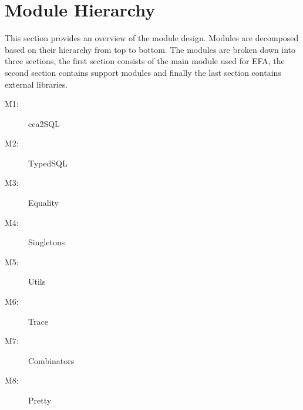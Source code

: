 \documentclass[12pt, svgnames]{article}
\begin{document}
\section{Module Hierarchy}
This section provides an overview of the module design. Modules are decomposed 
based on their hierarchy from top to bottom. The modules are broken down into 
three sections, the first section consists of the main module used for EFA, 
the second section contains support modules and finally the last section
contains external libraries.

\begin{description}
    \item[M1:] eca2SQL
    \item[M2:] TypedSQL
    \item[M3:] Equality
    \item[M4:] Singletons
    \item[M5:] Utils
    \item[M6:] Trace
    \item[M7:] Combinators
    \item[M8:] Pretty
\end{description}
\end{document}
